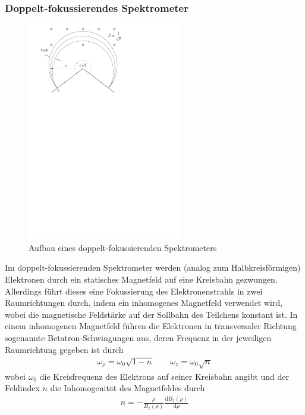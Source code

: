 \documentclass[11pt, a4paper]{article}
\numberwithin{equation}{section}
\begin{document}
\subsubsection{Doppelt-fokussierendes Spektrometer}
\begin{figure}[h]
	\centering
	\includegraphics[width=0.6\textwidth]{./figures/pisqrt2_spectrometer.pdf}
	\caption{Aufbau eines doppelt-fokussierenden Spektrometers}
	\label{fig:pisqrt2_spectro}
\end{figure}
\noindent Im doppelt-fokussierenden Spektrometer werden (analog zum Halbkreisförmigen) Elektronen durch ein statisches Magnetfeld auf eine Kreisbahn gezwungen.
Allerdings führt dieses eine Fokussierung des Elektronenstrahls in zwei Raumrichtungen durch, indem ein inhomogenes Magnetfeld verwendet wird, wobei die magnetische Feldstärke auf der Sollbahn des Teilchens konstant ist.
In einem inhomogenen Magnetfeld führen die Elektronen in transversaler Richtung sogenannte Betatron-Schwingungen aus, deren Frequenz in der jeweiligen Raumrichtung gegeben ist durch \cite{hillert}
\begin{align}
	\omega_\rho = \omega_0 \sqrt{1-n} \qquad \omega_z = \omega_0 \sqrt{n}
\end{align}
wobei $\omega_0$ die Kreisfrequenz des Elektrons auf seiner Kreisbahn angibt und der Feldindex $n$ die Inhomogenität des Magnetfeldes durch
\begin{align}
	n = - \frac{\rho}{B_z(\rho)} \frac{\mathrm{d} B_z(\rho)}{\mathrm{d} \rho}
\end{align}
\end{document}
